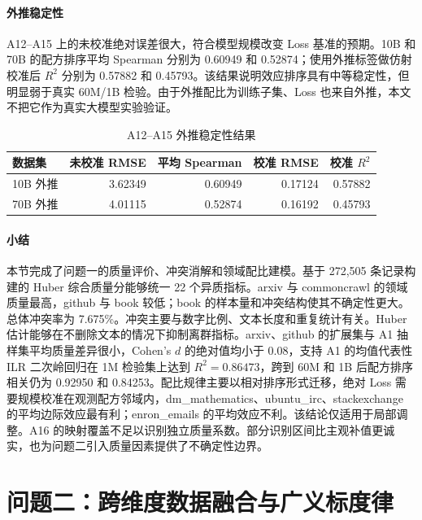 \documentclass[bwprint]{gmcmthesis}
\numberwithin{equation}{section}
\numberwithin{figure}{section}
\numberwithin{table}{section}
\begin{document}
        \paragraph{外推稳定性}
        A12--A15 上的未校准绝对误差很大，符合模型规模改变 Loss 基准的预期。10B 和 70B 的配方排序平均 Spearman 分别为 0.60949 和 0.52874；使用外推标签做仿射校准后 $R^2$ 分别为 0.57882 和 0.45793。该结果说明效应排序具有中等稳定性，但明显弱于真实 60M/1B 检验。由于外推配比为训练子集、Loss 也来自外推，本文不把它作为真实大模型实验验证。
        
        \begin{table}[H]
        \centering
        \caption{A12--A15 外推稳定性结果}  %
        \label{tab:extrapolation}
        \begin{tabular}{lrrrr}
        \toprule
        数据集 & 未校准 RMSE & 平均 Spearman & 校准 RMSE & 校准 $R^2$ \\
        \midrule
        10B 外推 & 3.62349 & 0.60949 & 0.17124 & 0.57882 \\
        70B 外推 & 4.01115 & 0.52874 & 0.16192 & 0.45793 \\
        \bottomrule
        \end{tabular}
        \end{table}


        \paragraph{小结}
        本节完成了问题一的质量评价、冲突消解和领域配比建模。基于 272,505 条记录构建的 Huber 综合质量分能够统一 22 个异质指标。arxiv 与 commoncrawl 的领域质量最高，github 与 book 较低；book 的样本量和冲突结构使其不确定性更大。总体冲突率为 7.675\%。冲突主要与数字比例、文本长度和重复统计有关。Huber 估计能够在不删除文本的情况下抑制离群指标。arxiv、github 的扩展集与 A1 抽样集平均质量差异很小，Cohen's $d$ 的绝对值均小于 0.08，支持 A1 的均值代表性ILR 二次岭回归在 1M 检验集上达到 $R^2=0.86473$，跨到 60M 和 1B 后配方排序相关仍为 0.92950 和 0.84253。配比规律主要以相对排序形式迁移，绝对 Loss 需要规模校准在观测配方邻域内，dm\_mathematics、ubuntu\_irc、stackexchange 的平均边际效应最有利；enron\_emails 的平均效应不利。该结论仅适用于局部调整。A16 的映射覆盖不足以识别独立质量系数。部分识别区间比主观补值更诚实，也为问题二引入质量因素提供了不确定性边界。


\section{问题二：跨维度数据融合与广义标度律}   %
\end{document}
